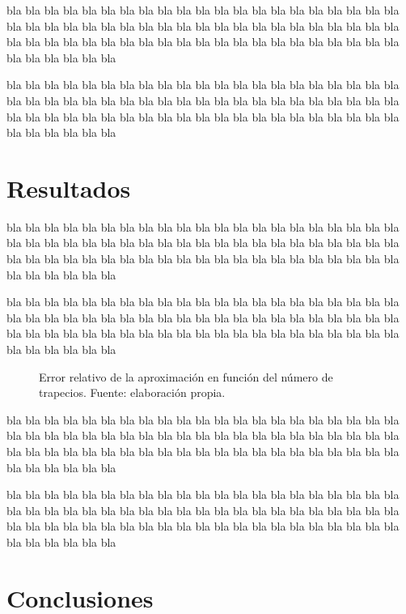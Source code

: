 bla bla bla bla bla bla bla bla bla bla bla bla bla bla bla bla bla bla bla
bla bla bla bla bla bla bla bla bla bla bla bla bla bla bla bla bla bla bla
bla bla bla bla bla bla bla bla bla bla bla bla bla bla bla bla bla bla bla
bla bla bla bla bla bla bla bla bla bla bla bla

bla bla bla bla bla bla bla bla bla bla bla bla bla bla bla bla bla bla bla
bla bla bla bla bla bla bla bla bla bla bla bla bla bla bla bla bla bla bla
bla bla bla bla bla bla bla bla bla bla bla bla bla bla bla bla bla bla bla
bla bla bla bla bla bla bla bla bla bla bla bla


\section{Resultados}
\label{sec:resultados}
bla bla bla bla bla bla bla bla bla bla bla bla bla bla bla bla bla bla bla
bla bla bla bla bla bla bla bla bla bla bla bla bla bla bla bla bla bla bla
bla bla bla bla bla bla bla bla bla bla bla bla bla bla bla bla bla bla bla
bla bla bla bla bla bla bla bla bla bla bla bla

bla bla bla bla bla bla bla bla bla bla bla bla bla bla bla bla bla bla bla
bla bla bla bla bla bla bla bla bla bla bla bla bla bla bla bla bla bla bla
bla bla bla bla bla bla bla bla bla bla bla bla bla bla bla bla bla bla bla
bla bla bla bla bla bla bla bla bla bla bla bla

\begin{figure}
  \centering
  \caption{Error relativo de la aproximación en función del número de
    trapecios. Fuente: elaboración propia.}
  \label{fig:Serror}
\end{figure}


bla bla bla bla bla bla bla bla bla bla bla bla bla bla bla bla bla bla bla
bla bla bla bla bla bla bla bla bla bla bla bla bla bla bla bla bla bla bla
bla bla bla bla bla bla bla bla bla bla bla bla bla bla bla bla bla bla bla
bla bla bla bla bla bla bla bla bla bla bla bla

bla bla bla bla bla bla bla bla bla bla bla bla bla bla bla bla bla bla bla
bla bla bla bla bla bla bla bla bla bla bla bla bla bla bla bla bla bla bla
bla bla bla bla bla bla bla bla bla bla bla bla bla bla bla bla bla bla bla
bla bla bla bla bla bla bla bla bla bla bla bla



\section{Conclusiones}
\label{sec:conclusiones}

